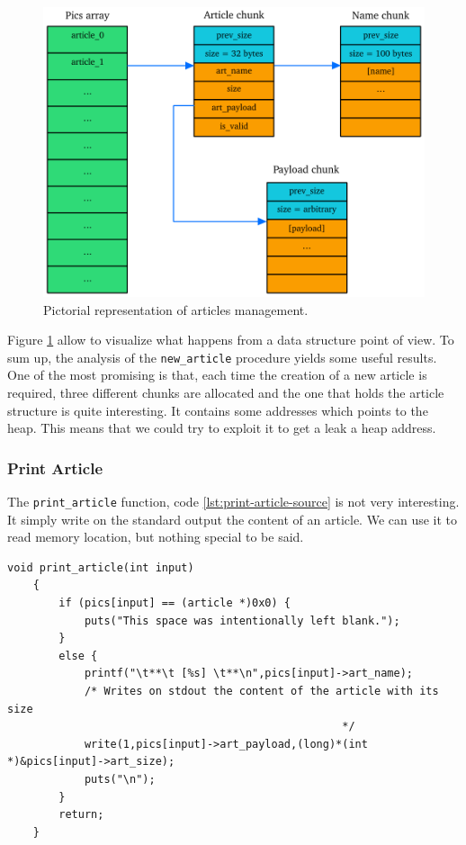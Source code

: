 \documentclass{article}
\numberwithin{equation}{subsection}
\begin{document}
\begin{figure}[H]
    \centering
    \includegraphics[width=\textwidth]{article_management_structure.pdf}
    \caption{Pictorial representation of articles management.}
    \label{fig:article_management_structure}
\end{figure}
Figure \ref{fig:article_management_structure} allow to visualize what happens from a data structure point of view.
To sum up, the analysis of the \texttt{new\_article} procedure yields some useful results. One of the most promising is that, each time the creation of a new article is required, three different chunks are allocated and the one that holds the article structure is quite interesting. It contains some addresses which points to the heap. This means that we could try to exploit it to get a leak a heap address.
\clearpage
\subsubsection{Print Article}
The \texttt{print\_article} function, code \ref{lst:print-article-source} is not very interesting. It simply write on the standard output the content of an article. We can use it to read memory location, but nothing special to be said.\newline
\begin{minipage}{\textwidth}
\centering
\lstset{style=cstyle}
\begin{lstlisting}[caption={Print\_article routine of asciigal source code.},captionpos=b,label={lst:print-article-source}]
    void print_article(int input)
    {
    	if (pics[input] == (article *)0x0) {
    		puts("This space was intentionally left blank.");
    	}
    	else {
    		printf("\t**\t [%s] \t**\n",pics[input]->art_name);
    		/* Writes on stdout the content of the article with its size
    												*/
    		write(1,pics[input]->art_payload,(long)*(int *)&pics[input]->art_size);
    		puts("\n");
    	}
    	return;
    }
\end{lstlisting}
\end{minipage}
\end{document}
